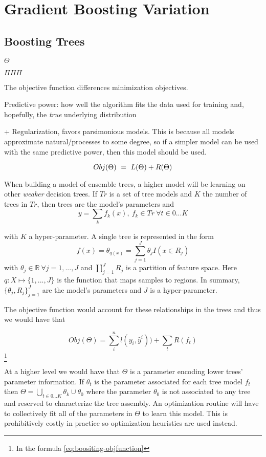\section{Gradient Boosting Variation}

\subsection{Boosting Trees    }

$\Theta$

$\Pi \Pi \Pi$

The objective function differences minimization objectives. 

Predictive power: how well the algorithm fits the data used for training and, hopefully, the \textit{true} underlying distribution

+ Regularization, favors parsimonious models. This is because all models approximate natural/processes to some degree, so if a simpler model can be used with the same predictive power, then this model should be used.  

\begin{equation} \label{eq:objFunction}
Obj(\Theta) \ = \ L(\Theta) + R(\Theta)
\\
\end{equation}

When building a model of ensemble trees, a higher model will be learning on other \textit{weaker} decision trees. If $Tr$ is a set of tree models and $K$ the number of trees in $Tr$, then trees are the model's parameters and
\[ y = \sum_k f_k(x) , \ f_k \in Tr \ \forall t \in {0...K}\]

with $K$ a hyper-parameter. A single tree is represented in the form 
\[
f(x) = \theta_{q(x)} = \sum_{j=1}^J \theta_j I(x \in  R_j)
\]
with $\theta_j \in \mathbb{R} \ \forall j = 1,...,J$ and $ \coprod_{j=1}^J R_j$ is a partition of feature space. Here $q : X \mapsto \{1,...,J\}$ is the function that maps samples to regions. In summary, $\{\theta_j, R_j\}_{j=1}^J$ are the model's parameters and $J$ is a hyper-parameter.

The objective function would account for these relationships in the trees and thus we would have that
 
\[ Obj(\Theta) = \sum_i^n l(y_i,\hat{y}^i))  +  \sum_t R(f_t) \] \label{eq:boositing-objfunction} \footnote{In the formula \ref{eq:boositing-objfunction} }
%    

At a higher level we would have that $\Theta$ is a parameter encoding lower trees' parameter information. If $\theta_t$ is the parameter associated for each tree model $f_t$ then $\Theta =  \bigcup_{t \in {0...K}} \theta_k  \cup \theta_0$ where the parameter $\theta_0$ is not associated to any tree and reserved to characterize the tree assembly. An optimization routine will have to collectively fit all of the parameters in $\Theta$ to learn this model. This is prohibitively costly in practice so optimization heuristics are used instead. 

